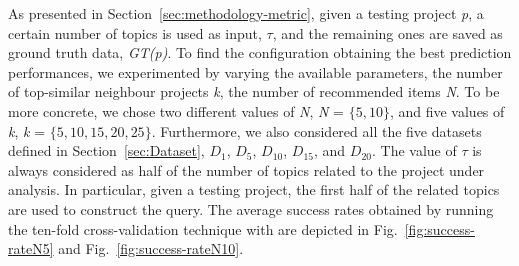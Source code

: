 As presented in Section~\ref{sec:methodology-metric}, given a 
testing project \emph{p}, a certain number of topics is used as 
input, \ie $\tau$, and the remaining ones are saved as ground 
truth data, \ie \emph{GT(p)}. To find the configuration 
obtaining the best prediction performances, we experimented 
by varying the available parameters, \ie the number of 
top-similar neighbour projects \emph{k}, the number of 
recommended items \emph{N}. %
To be more concrete, we chose two different values of \emph{N}, 
\ie \emph{N} = $\{5, 10\}$, and five values of \emph{k}, \ie 
\emph{k} = $\{5, 10, 15, 20, 25\}$. Furthermore, we also 
considered all the five datasets defined in 
Section~\ref{sec:Dataset}, \ie $D_{1}$, $D_{5}$, $D_{10}$, 
$D_{15}$, and $D_{20}$. The value of $\tau$ is always considered 
as half of the number of topics related to the project under 
analysis. In particular, given a testing project, the first half 
of the related topics are used to construct the query. The 
average success rates obtained by running the ten-fold 
cross-validation technique with \TFa are depicted in 
Fig.~\ref{fig:success-rateN5} and Fig.~\ref{fig:success-rateN10}.



